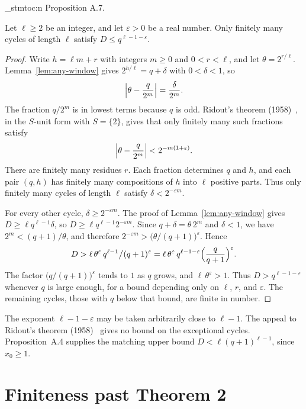 \documentclass[11pt]{article}
\newenvironment{named}[1]{%
  \par\addvspace{\medskipamount}%
  \pagebreak[3]%
  \noindent{\bfseries #1}\space\ignorespaces
  \stmtoc{#1}%
}{\par\addvspace{\medskipamount}}
\newcommand{\stmtoc}[1]{ \qn_stmtoc:n {#1} }
\begin{document}
\begin{named}{Proposition A.7.}
Let $\ell \ge 2$ be an integer, and let $\varepsilon > 0$ be a real number.
Only finitely many cycles of length $\ell$ satisfy $D \le q^{\ell - 1 - \varepsilon}$.
\end{named}

\begin{proof}
Write $h = \ell m + r$ with integers $m \ge 0$ and $0 < r < \ell$, and let $\theta = 2^{r/\ell}$.
Lemma~\ref{lem:any-window} gives $2^{h/\ell} = q + \delta$ with $0 < \delta < 1$, so
\[
\Bigl| \theta - \frac{q}{2^m} \Bigr| = \frac{\delta}{2^m}.
\]
The fraction $q/2^m$ is in lowest terms because $q$ is odd.
Ridout's theorem (1958)~\cite{ridout}, in the $S$-unit form with $S = \{2\}$, gives that only finitely many such fractions satisfy
\[
\Bigl| \theta - \frac{q}{2^m} \Bigr| < 2^{-m(1+\varepsilon)}.
\]
There are finitely many residues $r$.
Each fraction determines $q$ and $h$, and each pair $(q, h)$ has finitely many compositions of $h$ into $\ell$ positive parts.
Thus only finitely many cycles of length $\ell$ satisfy $\delta < 2^{-\varepsilon m}$.

For every other cycle, $\delta \ge 2^{-\varepsilon m}$.
The proof of Lemma~\ref{lem:any-window} gives $D \ge \ell q^{\ell-1}\delta$, so $D \ge \ell q^{\ell-1} 2^{-\varepsilon m}$.
Since $q + \delta = \theta\, 2^m$ and $\delta < 1$, we have $2^m < (q+1)/\theta$, and therefore $2^{-\varepsilon m} > \bigl(\theta/(q+1)\bigr)^\varepsilon$.
Hence
\[
D > \ell\, \theta^\varepsilon\, q^{\ell-1} \big/ (q+1)^\varepsilon = \ell\, \theta^\varepsilon\, q^{\ell-1-\varepsilon} \Bigl(\frac{q}{q+1}\Bigr)^\varepsilon.
\]
The factor $\bigl(q/(q+1)\bigr)^\varepsilon$ tends to $1$ as $q$ grows, and $\ell\, \theta^\varepsilon > 1$.
Thus $D > q^{\ell-1-\varepsilon}$ whenever $q$ is large enough, for a bound depending only on $\ell$, $r$, and $\varepsilon$.
The remaining cycles, those with $q$ below that bound, are finite in number.
\end{proof}

The exponent $\ell - 1 - \varepsilon$ may be taken arbitrarily close to $\ell - 1$.
The appeal to Ridout's theorem (1958)~\cite{ridout} gives no bound on the exceptional cycles.
Proposition~A.4 supplies the matching upper bound $D < \ell(q+1)^{\ell-1}$, since $x_0 \ge 1$.

\section{Finiteness past Theorem 2}
\label{app:narrow}
\end{document}
